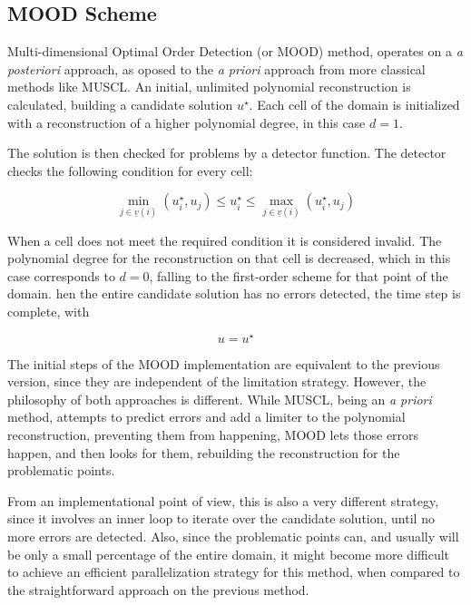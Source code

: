 \subsection{MOOD Scheme}
\label{sec:420}

Multi-dimensional Optimal Order Detection (or MOOD) method, operates on a \textit{a posteriori} approach, as oposed to the \textit{a priori} approach from more classical methods like MUSCL.
An initial, unlimited polynomial reconstruction is calculated, building a candidate solution $u^{\star}$. Each cell of the domain is initialized with a reconstruction of a higher polynomial degree, in this case $d=1$.

The solution is then checked for problems by a detector function. The detector checks the following condition for every cell:

$$ \min_{j \in \underline{v}(i)}(u_i^{\star}, u_j) \le u_i^{\star} \le \max_{j \in \underline{v}(i)}(u_i^{\star}, u_j) $$

 
When a cell does not meet the required condition it is considered invalid. The polynomial degree for the reconstruction on that cell is decreased, which in this case corresponds to $d=0$, falling to the first-order scheme for that point of the domain.
 hen the entire candidate solution has no errors detected, the time step is complete, with

$$ u = u^{\star} $$

The initial steps of the MOOD implementation are equivalent to the previous version, since they are independent of the limitation strategy. However, the philosophy of both approaches is different. While MUSCL, being an \textit{a priori} method, attempts to predict errors and add a limiter to the polynomial reconstruction, preventing them from happening, MOOD lets those errors happen, and then looks for them, rebuilding the reconstruction for the problematic points.

From an implementational point of view, this is also a very different strategy, since it involves an inner loop to iterate over the candidate solution, until no more errors are detected. Also, since the problematic points can, and usually will be only a small percentage of the entire domain, it might become more difficult to achieve an efficient parallelization strategy for this method, when compared to the straightforward approach on the previous method.